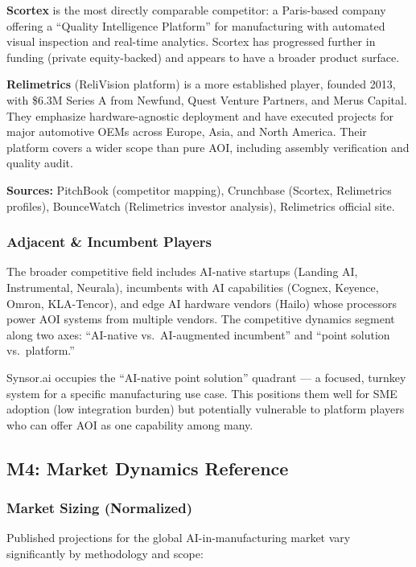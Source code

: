\documentclass[11pt,letterpaper]{article}
\begin{document}
\textbf{Scortex} is the most directly comparable competitor: a Paris-based company offering a ``Quality Intelligence Platform'' for manufacturing with automated visual inspection and real-time analytics. Scortex has progressed further in funding (private equity-backed) and appears to have a broader product surface.

\textbf{Relimetrics} (ReliVision platform) is a more established player, founded 2013, with \$6.3M Series A from Newfund, Quest Venture Partners, and Merus Capital. They emphasize hardware-agnostic deployment and have executed projects for major automotive OEMs across Europe, Asia, and North America. Their platform covers a wider scope than pure AOI, including assembly verification and quality audit.

\textbf{Sources:} PitchBook (competitor mapping), Crunchbase (Scortex, Relimetrics profiles), BounceWatch (Relimetrics investor analysis), Relimetrics official site.

\subsubsection{Adjacent \& Incumbent Players}

The broader competitive field includes AI-native startups (Landing AI, Instrumental, Neurala), incumbents with AI capabilities (Cognex, Keyence, Omron, KLA-Tencor), and edge AI hardware vendors (Hailo) whose processors power AOI systems from multiple vendors. The competitive dynamics segment along two axes: ``AI-native vs.\ AI-augmented incumbent'' and ``point solution vs.\ platform.''

Synsor.ai occupies the ``AI-native point solution'' quadrant --- a focused, turnkey system for a specific manufacturing use case. This positions them well for SME adoption (low integration burden) but potentially vulnerable to platform players who can offer AOI as one capability among many.

\subsection{M4: Market Dynamics Reference}

\subsubsection{Market Sizing (Normalized)}

Published projections for the global AI-in-manufacturing market vary significantly by methodology and scope:
\end{document}
